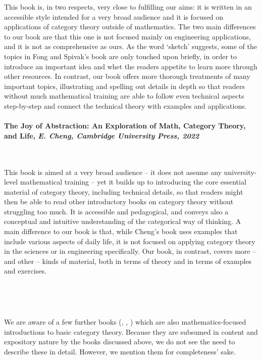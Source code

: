 \documentclass[10pt, article, one side]{memoir}
\begin{document}
    This book is, in two respects, very close to fulfilling our aims: it is written in an accessible style intended for a very broad audience and it is focused on applications of category theory outside of mathematics.
    The two main differences to our book are that this one is not focused mainly on engineering applications, and it is not as comprehensive as ours.
    As the word `sketch' suggests, some of the topics in Fong and Spivak's book are only touched upon briefly, in order to introduce an important idea and whet the readers appetite to learn more through other resources.
    In contrast, our book offers more thorough treatments of many important topics, illustrating and spelling out details in depth so that readers without much mathematical training are able to follow even technical aspects step-by-step and connect the technical theory with examples and applications.

    \paragraph{The Joy of Abstraction: An Exploration of Math, Category Theory, and Life, \emph{E.
            Cheng, Cambridge University Press, 2022}~\cite{cheng2022joy}}
    \

    This book is aimed at a very broad audience -- it does not assume any university-level mathematical training -- yet it builds up to introducing the core essential material of category theory, including technical details, so that readers might then be able to read other introductory books on category theory without struggling too much.
    It is accessible and pedagogical, and conveys also a conceptual and intuitive understanding of the categorical way of thinking.
    A main difference to our book is that, while Cheng's book uses examples that include various aspects of daily life, it is not focused on applying category theory in the sciences or in engineering specifically.
    Our book, in contrast, covers more -- and other -- kinds of material, both in terms of theory and in terms of examples and exercises.

    \

\

    We are aware of a few further books (\cite{Grandis}, \cite{Roman}, \cite{Simmons}) which are also mathematics-focused introductions to basic category theory.
    Because they are subsumed in content and expository nature by the books discussed above, we do not see the need to describe these in detail.
    However, we mention them for completeness' sake.
\end{document}
